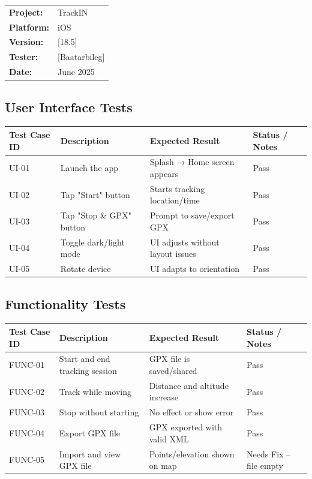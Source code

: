 \documentclass[12pt]{article}
\begin{document}
\begin{tabular}{ll}
\textbf{Project:} & TrackIN \\
\textbf{Platform:} & iOS \\
\textbf{Version:} & [18.5] \\
\textbf{Tester:} & [Baatarbileg] \\
\textbf{Date:} & June 2025 \\
\end{tabular}

\subsection{User Interface Tests}
\begin{longtable}{|p{2.2cm}|p{5.2cm}|p{4cm}|p{2.5cm}|}
\hline
\textbf{Test Case ID} & \textbf{Description} & \textbf{Expected Result} & \textbf{Status / Notes} \\
\hline
UI-01 & Launch the app & Splash → Home screen appears & Pass \\
\hline
UI-02 & Tap "Start" button & Starts tracking location/time & Pass \\
\hline
UI-03 & Tap "Stop \& GPX" button & Prompt to save/export GPX & Pass \\
\hline
UI-04 & Toggle dark/light mode & UI adjusts without layout issues & Pass \\
\hline
UI-05 & Rotate device & UI adapts to orientation & Pass \\
\hline
\end{longtable}

\subsection{Functionality Tests}
\begin{longtable}{|p{2.2cm}|p{5.2cm}|p{4cm}|p{2.5cm}|}
\hline
\textbf{Test Case ID} & \textbf{Description} & \textbf{Expected Result} & \textbf{Status / Notes} \\
\hline
FUNC-01 & Start and end tracking session & GPX file is saved/shared & Pass \\
\hline
FUNC-02 & Track while moving & Distance and altitude increase & Pass \\
\hline
FUNC-03 & Stop without starting & No effect or show error & Pass \\
\hline
FUNC-04 & Export GPX file & GPX exported with valid XML & Pass \\
\hline
FUNC-05 & Import and view GPX file & Points/elevation shown on map & Needs Fix – file empty \\
\hline
\end{longtable}
\end{document}
